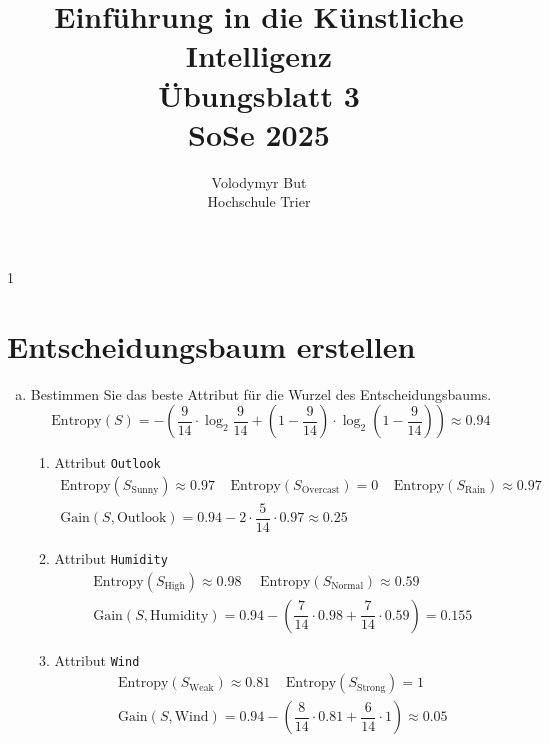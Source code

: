 \documentclass[10pt, oneside]{article}
\title{Einführung in die Künstliche Intelligenz\\[15pt]\Large{Übungsblatt 3}\\[10pt]\Large{SoSe 2025}}
\author{Volodymyr But\\[10pt]Hochschule Trier}
\date{}
\begin{document}
\maketitle
\vspace{25px}

\setcounter{section}
{1} %
\section{Entscheidungsbaum erstellen}

\begin{enumerate}[(a)]
    \item Bestimmen Sie das beste Attribut für die Wurzel des Entscheidungsbaums.
        \begin{equation*}
            \text{Entropy}(S) = -\left(\dfrac{9}{14} \cdot \log_2 \dfrac{9}{14} + \left(1 - \dfrac{9}{14}\right) \cdot \log_2\left(1 - \dfrac{9}{14}\right)\right) \approx 0.94
        \end{equation*}
        \begin{enumerate}[1.]
           \item Attribut \verb|Outlook|
            \begin{gather*}
                \text{Entropy}(S_\text{Sunny}) \approx 0.97 \ \ \ \ \ \text{Entropy}(S_\text{Overcast}) = 0 \ \ \ \ \ \text{Entropy}(S_\text{Rain}) \approx 0.97 \\[5pt]
                \text{Gain}(S, \text{Outlook}) = 0.94 - 2 \cdot \dfrac{5}{14} \cdot 0.97 \approx 0.25
            \end{gather*}

           \item Attribut \verb|Humidity|
            \begin{gather*}
                \text{Entropy}(S_\text{High}) \approx 0.98 \ \ \ \ \ \ \text{Entropy}(S_\text{Normal}) \approx 0.59 \\[10pt]
                \text{Gain}(S, \text{Humidity}) = 0.94 - \left(\dfrac{7}{14} \cdot 0.98 + \dfrac{7}{14} \cdot 0.59\right) = 0.155
            \end{gather*}
           \item Attribut \verb|Wind|
            \begin{gather*}
                \text{Entropy}(S_\text{Weak}) \approx 0.81 \ \ \ \ \ \text{Entropy}(S_\text{Strong}) = 1 \\[10pt]
                \text{Gain}(S, \text{Wind}) = 0.94 - \left(\dfrac{8}{14} \cdot 0.81 + \dfrac{6}{14} \cdot 1\right) \approx 0.05
            \end{gather*}
    \end{enumerate}


\end{enumerate}
\end{document}
